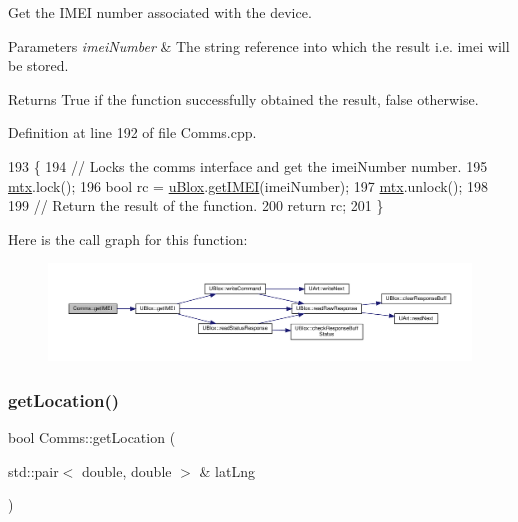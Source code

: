 Get the I\+M\+EI number associated with the device.


\begin{DoxyParams}{Parameters}
{\em imei\+Number} & The string reference into which the result i.\+e. imei will be stored. \\
\hline
\end{DoxyParams}
\begin{DoxyReturn}{Returns}
True if the function successfully obtained the result, false otherwise. 
\end{DoxyReturn}


Definition at line 192 of file Comms.\+cpp.


\begin{DoxyCode}
193 \{
194     \textcolor{comment}{// Locks the comms interface and get the imeiNumber number.}
195     \hyperlink{class_comms_a21df861b1202573e4cd0cb5666d638fe}{mtx}.lock();
196     \textcolor{keywordtype}{bool} rc = \hyperlink{class_comms_ac64dea134b116147e5441172346dbd6c}{uBlox}.\hyperlink{class_u_blox_ade30654ab2eab43d322dc6b516866401}{getIMEI}(imeiNumber);
197     \hyperlink{class_comms_a21df861b1202573e4cd0cb5666d638fe}{mtx}.unlock();
198 
199     \textcolor{comment}{// Return the result of the function.}
200     \textcolor{keywordflow}{return} rc;
201 \}
\end{DoxyCode}
Here is the call graph for this function\+:
\nopagebreak
\begin{figure}[H]
\begin{center}
\leavevmode
\includegraphics[width=350pt]{d8/dcc/class_comms_ab545396d2360e34fd94e7c3a996e967d_cgraph}
\end{center}
\end{figure}
\mbox{\label{class_comms_a26030245503e82aa6278e39cd0886c31}} 
\subsubsection{\texorpdfstring{get\+Location()}{getLocation()}\hspace{0.1cm}{\footnotesize\ttfamily [1/2]}}
{\footnotesize\ttfamily bool Comms\+::get\+Location (\begin{DoxyParamCaption}\item[{std\+::pair$<$ double, double $>$ \&}]{lat\+Lng }\end{DoxyParamCaption})}

